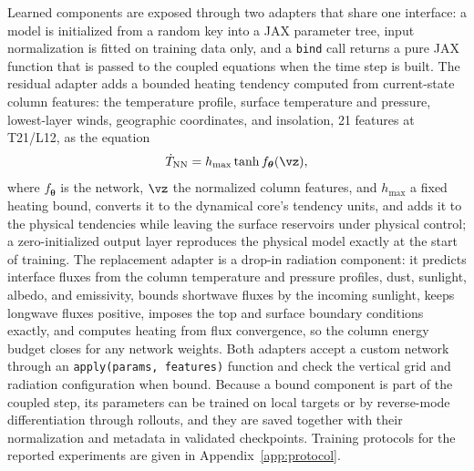 \documentclass{article} %
\begin{document}
Learned components are exposed through two adapters that share one interface: a model is initialized from a random key into a JAX parameter tree, input normalization is fitted on training data only, and a \texttt{bind} call returns a pure JAX function that is passed to the coupled equations when the time step is built. The residual adapter adds a bounded heating tendency computed from current-state column features: the temperature profile, surface temperature and pressure, lowest-layer winds, geographic coordinates, and insolation, 21 features at T21/L12, as the equation
\begin{equation}
 \dot T_{\mathrm{NN}}=h_{\max}\tanh f_{\boldsymbol{\theta}}(\vz),
 \label{eq:neural}
\end{equation}
where $f_{\boldsymbol{\theta}}$ is the network, $\vz$ the normalized column features, and $h_{\max}$ a fixed heating bound, converts it to the dynamical core's tendency units, and adds it to the physical tendencies while leaving the surface reservoirs under physical control; a zero-initialized output layer reproduces the physical model exactly at the start of training. The replacement adapter is a drop-in radiation component: it predicts interface fluxes from the column temperature and pressure profiles, dust, sunlight, albedo, and emissivity, bounds shortwave fluxes by the incoming sunlight, keeps longwave fluxes positive, imposes the top and surface boundary conditions exactly, and computes heating from flux convergence, so the column energy budget closes for any network weights. Both adapters accept a custom network through an \texttt{apply(params, features)} function and check the vertical grid and radiation configuration when bound. Because a bound component is part of the coupled step, its parameters can be trained on local targets or by reverse-mode differentiation through rollouts, and they are saved together with their normalization and metadata in validated checkpoints. Training protocols for the reported experiments are given in Appendix~\ref{app:protocol}.
\end{document}
